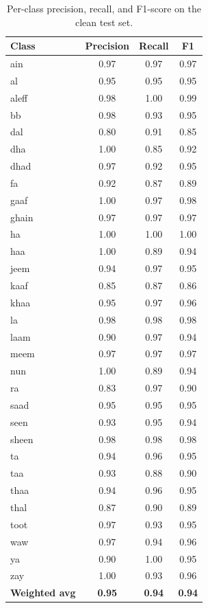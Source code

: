 \begin{table}[t]
\centering
\caption{Per-class precision, recall, and F1-score on the clean test set.}
\label{tab:perclass}
\small
\begin{tabular}{lccc}
\toprule
\textbf{Class} & \textbf{Precision} & \textbf{Recall} & \textbf{F1} \\
\midrule
ain   & 0.97 & 0.97 & 0.97 \\
al    & 0.95 & 0.95 & 0.95 \\
aleff & 0.98 & 1.00 & 0.99 \\
bb    & 0.98 & 0.93 & 0.95 \\
dal   & 0.80 & 0.91 & 0.85 \\
dha   & 1.00 & 0.85 & 0.92 \\
dhad  & 0.97 & 0.92 & 0.95 \\
fa    & 0.92 & 0.87 & 0.89 \\
gaaf  & 1.00 & 0.97 & 0.98 \\
ghain & 0.97 & 0.97 & 0.97 \\
ha    & 1.00 & 1.00 & 1.00 \\
haa   & 1.00 & 0.89 & 0.94 \\
jeem  & 0.94 & 0.97 & 0.95 \\
kaaf  & 0.85 & 0.87 & 0.86 \\
khaa  & 0.95 & 0.97 & 0.96 \\
la    & 0.98 & 0.98 & 0.98 \\
laam  & 0.90 & 0.97 & 0.94 \\
meem  & 0.97 & 0.97 & 0.97 \\
nun   & 1.00 & 0.89 & 0.94 \\
ra    & 0.83 & 0.97 & 0.90 \\
saad  & 0.95 & 0.95 & 0.95 \\
seen  & 0.93 & 0.95 & 0.94 \\
sheen & 0.98 & 0.98 & 0.98 \\
ta    & 0.94 & 0.96 & 0.95 \\
taa   & 0.93 & 0.88 & 0.90 \\
thaa  & 0.94 & 0.96 & 0.95 \\
thal  & 0.87 & 0.90 & 0.89 \\
toot  & 0.97 & 0.93 & 0.95 \\
waw   & 0.97 & 0.94 & 0.96 \\
ya    & 0.90 & 1.00 & 0.95 \\
zay   & 1.00 & 0.93 & 0.96 \\
\midrule
\textbf{Weighted avg} & \textbf{0.95} & \textbf{0.94} & \textbf{0.94} \\
\bottomrule
\end{tabular}
\end{table}

